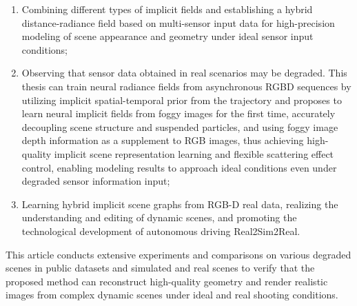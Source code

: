 \begin{abstractEn}
\begin{enumerate}
    \item Combining different types of implicit fields and establishing a hybrid distance-radiance field based on multi-sensor input data for high-precision modeling of scene appearance and geometry under ideal sensor input conditions;
    \item Observing that sensor data obtained in real scenarios may be degraded. This thesis can train neural radiance fields from asynchronous RGBD sequences by utilizing implicit spatial-temporal prior from the trajectory and proposes to learn neural implicit fields from foggy images for the first time, accurately decoupling scene structure and suspended particles, and using foggy image depth information as a supplement to RGB images, thus achieving high-quality implicit scene representation learning and flexible scattering effect control, enabling modeling results to approach ideal conditions even under degraded sensor information input;
    \item Learning hybrid implicit scene graphs from RGB-D real data, realizing the understanding and editing of dynamic scenes, and promoting the technological development of autonomous driving Real2Sim2Real.
\end{enumerate}
This article conducts extensive experiments and comparisons on various degraded scenes in public datasets and simulated and real scenes to verify that the proposed method can reconstruct high-quality geometry and render realistic images from complex dynamic scenes under ideal and real shooting conditions.

\end{abstractEn}

